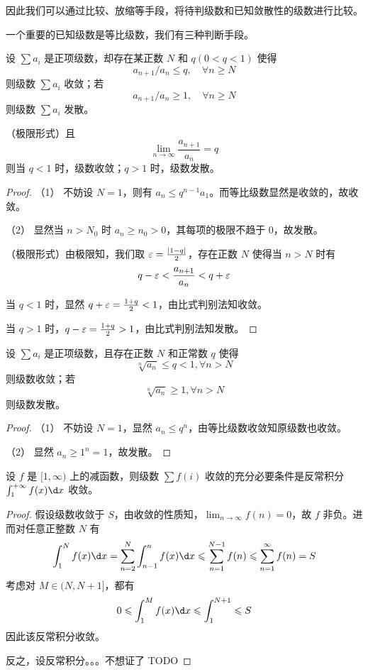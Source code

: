 因此我们可以通过比较、放缩等手段，将待判级数和已知敛散性的级数进行比较。

一个重要的已知级数是等比级数，我们有三种判断手段。

\begin{theorem}[比式判别法]
	设 $\sum a_i$ 是正项级数，却存在某正数 $N$ 和 $q(0 < q < 1)$ 使得
	\[ a_{n+1} / a_n \leqslant q, \quad \forall n \geqslant N \]
	则级数 $\sum a_i$ 收敛；若
	\[ a_{n+1} / a_n \geqslant 1, \quad \forall n \geqslant N \]
	则级数 $\sum a_i$ 发散。
	
	
	（极限形式）且
	\[ \lim_{n \to \infty} \frac{a_{n+1}}{a_n} = q \]
	则当 $q < 1$ 时，级数收敛；$q > 1$ 时，级数发散。
\end{theorem}

\begin{proof}
	（1） 不妨设 $N = 1$，则有 $a_n \leqslant q^{n-1}a_1$。而等比级数显然是收敛的，故收敛。
	
	（2） 显然当 $n > N_0$ 时 $a_n \geqslant n_0 > 0$，其每项的极限不趋于 $0$，故发散。
	
	（极限形式）由极限知，我们取 $\varepsilon = \frac{|1-q|}{2}$，存在正数 $N$ 使得当 $n > N$ 时有
	\[ q - \varepsilon < \frac{a_{n+1}}{a_n} < q + \varepsilon \]
	
	当 $q<1$ 时，显然 $q + \varepsilon = \frac{1+q}{2} < 1$，由比式判别法知收敛。
	
	当 $q > 1$ 时，$q - \varepsilon = \frac{1+q}{2} > 1$，由比式判别法知发散。
\end{proof}

\begin{theorem}
	设 $\sum a_i$ 是正项级数，且存在正数 $N$ 和正常数 $q$ 使得
	\[ \sqrt[n]{a_n} \leqslant q < 1, \forall n > N \]
	则级数收敛；若
	\[ \sqrt[n]{a_n} \geqslant 1, \forall n > N \]
	则级数发散。
\end{theorem}

\begin{proof}
	（1） 不妨设 $N=1$，显然 $a_n \leqslant q^n$，由等比级数收敛知原级数也收敛。
	
	（2） 显然 $a_n \geqslant 1^n = 1$，故发散。
\end{proof}

\begin{theorem}[积分判别法]
	设 $f$ 是 $[1, \infty)$ 上的减函数，则级数 $\sum f(i)$ 收敛的充分必要条件是反常积分 $\int_{1}^{+\infty} f(x) \d x$ 收敛。
\end{theorem}

\begin{proof}
	假设级数收敛于 $S$，由收敛的性质知，$\lim_{n \to \infty} f(n) = 0$，故 $f$ 非负。进而对任意正整数 $N$ 有
	\[ \int_{1}^{N} f(x) \d x = \sum_{n=2}^N \int_{n -1}^{n} f(x) \d x \leqslant \sum_{n=1}^{N-1} f(n) \leqslant \sum_{n=1}^{\infty} f(n) = S \]
	考虑对 $M \in (N, N + 1]$，都有
	\[ 0 \leqslant \int_{1}^{M} f(x) \d x \leqslant \int_{1}^{N+1} \leqslant S \]
	因此该反常积分收敛。
	
	反之，设反常积分。。。不想证了 TODO
\end{proof}

